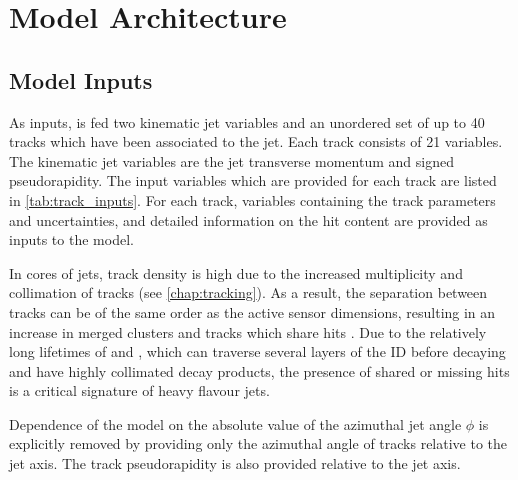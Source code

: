 \section{Model Architecture}\label{sec:networks}

\subsection{Model Inputs}\label{sec:model-inputs}

\newcommand{\ipdefsfootnote}{%
Impact parameter significances are defined as the IP divided by its corresponding uncertainty, $\dzerosig = d_0 / \dzerouncert$ and $\zzerosig = z_0 / \zzerouncert$.
Track IP significances are lifetime signed according to the track's direction with respect to the jet axis and the primary vertex \cite{PERF-2012-04}.
}

As inputs, \GNN is fed two kinematic jet variables and an unordered set of up to 40 tracks which have been associated to the jet.
Each track consists of 21 variables.
The kinematic jet variables are the jet transverse momentum and signed pseudorapidity.
The input variables which are provided for each track are listed in \cref{tab:track_inputs}.
For each track, variables containing the track parameters and uncertainties, and detailed information on the hit content are provided as inputs to the model.

In cores of \highpt jets, track density is high due to the increased multiplicity and collimation of tracks (see \cref{chap:tracking}).
As a result, the separation between tracks can be of the same order as the active sensor dimensions, resulting in an increase in merged clusters and tracks which share hits \cite{PERF-2015-08}.
Due to the relatively long lifetimes of \bhadrons and \chadrons, which can traverse several layers of the ID before decaying and have highly collimated decay products, the presence of shared or missing hits is a critical signature of heavy flavour jets.

Dependence of the model on the absolute value of the azimuthal jet angle $\phi$ is explicitly removed by providing only the azimuthal angle of tracks relative to the jet axis. The track pseudorapidity is also provided relative to the jet axis.


